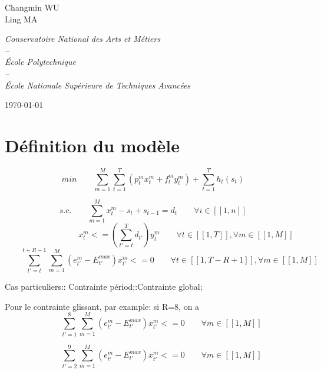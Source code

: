 \documentclass[12pt,a4paper]{article}
\begin{document}
\begin{center}
\begin{Large}\color{carmine}
	Changmin WU\\
	Ling MA\\
\end{Large}
\vspace{5cm}

\begin{large}
	\textit{Conservatoire National des Arts et Métiers\\
	--\\
	\'Ecole Polytechnique\\
	--\\
	\'Ecole Nationale Supérieure de Techniques Avancées\\}
\end{large}
\vfill

\today
\end{center}

\thispagestyle{empty}
\newpage


\section{Définition du modèle}
\[
	min\qquad \sum_{m=1}^M \sum_{t=1}^T (p_t^mx_t^m + f_t^my_t^m)+ \sum_{t=1}^T h_t(s_t)
\]

\[
	s.c.\qquad \sum_{m=1}^M x_t^m - s_t+s_{t-1}=d_t\qquad \forall i \in [\![1,n]\!]
\]
\[
	\qquad \qquad \qquad \qquad x_t^m<=(\sum_{t'=t}^T d_{t'})y_t^m\qquad \forall t \in [\![1,T]\!],\forall m \in [\![1,M]\!]
\]
\[
	\qquad \sum_{t'=t}^{t+R-1}\sum_{m=1}^M(e_{t'}^m-E_{t'}^{max})x_{t'}^m<=0\qquad \forall t \in [\![1,T-R+1]\!],\forall m \in [\![1,M]\!]
\]

\begin{flushright}
Cas particuliers:\newline
[R=1]: Contrainte périod;\newline
[R=T]:Contrainte global;\newline
\end{flushright}


Pour le contrainte glissant,  par example: si R=8, on a
\[
	\qquad \sum_{t'=1}^{8}\sum_{m=1}^M(e_{t'}^m-E^{max}_{t'})x_{t'}^m<=0\qquad \forall m \in [\![1,M]\!]
\]

\[
	\qquad \sum_{t'=2}^{9}\sum_{m=1}^M(e_{t'}^m-E^{max}_{t'})x_{t'}^m<=0\qquad \forall m \in [\![1,M]\!]
\]
\end{document}
